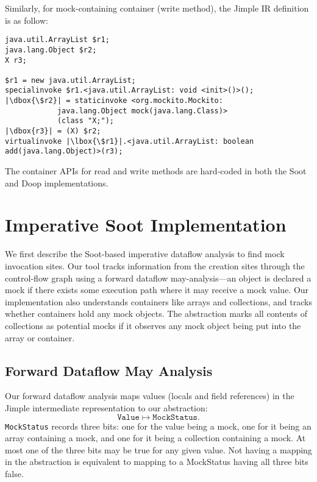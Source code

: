 Similarly, for mock-containing container (write method), the Jimple IR definition is as follow:

\begin{lstlisting}[basicstyle=\linespread{1.0}\ttfamily\small,numbers=none,escapechar={|}]
java.util.ArrayList $r1;
java.lang.Object $r2;
X r3;

$r1 = new java.util.ArrayList;
specialinvoke $r1.<java.util.ArrayList: void <init>()>();
|\dbox{\$r2}| = staticinvoke <org.mockito.Mockito: 
			java.lang.Object mock(java.lang.Class)>
			(class "X;");
|\dbox{r3}| = (X) $r2;
virtualinvoke |\lbox{\$r1}|.<java.util.ArrayList: boolean add(java.lang.Object)>(r3);
\end{lstlisting}

The container APIs for read and write methods are hard-coded in both the Soot and Doop implementations.

\section{Imperative Soot Implementation}
\label{sec:soot}
We first describe the Soot-based imperative dataflow analysis to find mock invocation sites. Our tool tracks information from the creation sites through the control-flow graph using a forward dataflow may-analysis---an object is declared a mock if there exists some execution path where it may receive a mock value. Our implementation also understands containers like arrays and collections, and tracks whether containers hold any mock objects. The abstraction marks all contents of collections as potential mocks if it observes any mock object being put into the array or container.


\subsection{Forward Dataflow May Analysis}

Our forward dataflow analysis maps values (locals and field references) in the Jimple intermediate representation to our abstraction:
\[ \mathtt{Value} \mapsto \mathtt{MockStatus}. \]
\texttt{MockStatus} records three bits: one for the value being a mock, one for it being an array containing a mock, and one for it being a collection containing a mock. At most one of the three bits may be true for any given value. Not having a mapping in the abstraction is equivalent to mapping to a MockStatus having all three bits false. 

